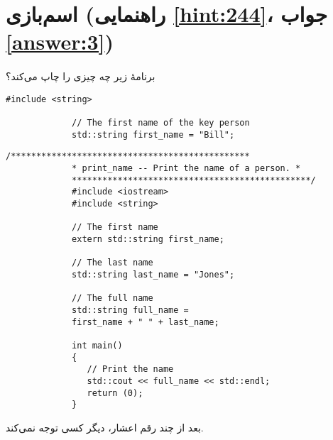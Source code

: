 \section[اسم‌بازی]{اسم‌بازی \protect{} (راهنمایی \ref{hint:244}، جواب \ref{answer:3})}
\paragraph{}\label{prog:92}
برنامهٔ زیر چه چیزی را چاپ می‌کند؟

\begin{LTR}
        \begin{lstlisting}[style=C++Style]
             #include <string>

             // The first name of the key person
             std::string first_name = "Bill";
        \end{lstlisting}
\end{LTR}

\begin{LTR}
        \begin{lstlisting}[style=C++Style]
             /***********************************************
             * print_name -- Print the name of a person. *
             ***********************************************/
             #include <iostream>
             #include <string>

             // The first name
             extern std::string first_name;

             // The last name
             std::string last_name = "Jones";

             // The full name
             std::string full_name =
             first_name + " " + last_name;

             int main()
             {
             	// Print the name
             	std::cout << full_name << std::endl;
             	return (0);
             }
        \end{lstlisting}
\end{LTR}

\begin{tcolorbox}
    بعد از چند رقم اعشار، دیگر کسی توجه نمی‌کند.
\end{tcolorbox}